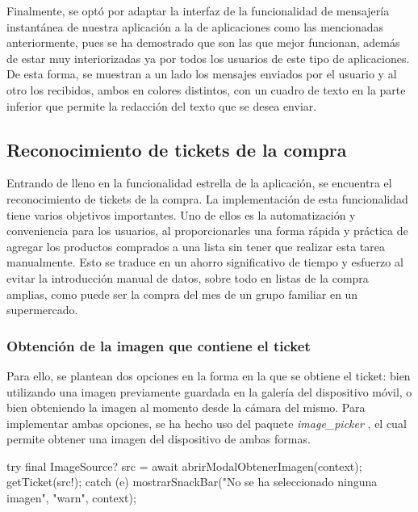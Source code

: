 \documentclass{article}
\begin{document}
Finalmente, se optó por adaptar la interfaz de la funcionalidad de mensajería instantánea de nuestra aplicación a la de aplicaciones como las mencionadas anteriormente, pues se ha demostrado que son las que mejor funcionan, además de estar muy interiorizadas ya por todos los usuarios de este tipo de aplicaciones. De esta forma, se muestran a un lado los mensajes enviados por el usuario y al otro los recibidos, ambos en colores distintos, con un cuadro de texto en la parte inferior que permite la redacción del texto que se desea enviar.

\subsection{Reconocimiento de tickets de la compra}

Entrando de lleno en la funcionalidad estrella de la aplicación, se encuentra el reconocimiento de tickets de la compra. La implementación de esta funcionalidad tiene varios objetivos importantes. Uno de ellos es la automatización y conveniencia para los usuarios, al proporcionarles una forma rápida y práctica de agregar los productos comprados a una lista sin tener que realizar esta tarea manualmente. Esto se traduce en un ahorro significativo de tiempo y esfuerzo al evitar la introducción manual de datos, sobre todo en listas de la compra amplias, como puede ser la compra del mes de un grupo familiar en un supermercado.

\subsubsection{Obtención de la imagen que contiene el ticket}

Para ello, se plantean dos opciones en la forma en la que se obtiene el ticket: bien utilizando una imagen previamente guardada en la galería del dispositivo móvil, o bien obteniendo la imagen al momento desde la cámara del mismo. Para implementar ambas opciones, se ha hecho uso del paquete \textit{image\_picker} \cite{ImagePicker}, el cual permite obtener una imagen del dispositivo de ambas formas.

\vspace{0.5cm}
\begin{codigo}
try {
    final ImageSource? src = await abrirModalObtenerImagen(context);
    getTicket(src!);
} catch (e) {
    mostrarSnackBar("No se ha seleccionado ninguna imagen", "warn",
    context);
}
\end{codigo}
\end{document}
